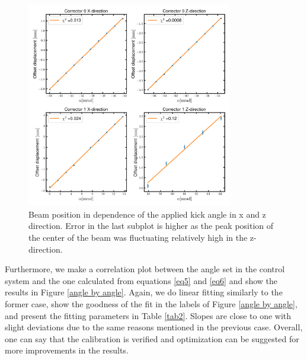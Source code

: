\documentclass[12pt]{article}
\begin{document}
\begin{figure}[H]
    \centering
    \includegraphics[width = 0.8\textwidth]{fig/displacement_by_angle_kickangle.png}
    \caption{Beam position in dependence of the applied kick angle in x and z direction. Error in the last subplot is higher as the peak position of the center of the beam was fluctuating relatively high in the z-direction.}
    \label{kick angle}
\end{figure}

Furthermore, we make a correlation plot between the 
angle set in the control system and the one calculated from equations \ref{eq5} and \ref{eq6} and show the results in Figure \ref{angle by angle}. 
Again, we do linear fitting similarly to the former case, show the goodness of the fit in the labels of Figure \ref{angle by angle}, and present the fitting parameters in Table \ref{tab2}. Slopes are close to one with slight deviations due to the same reasons mentioned in the previous case. Overall, one can say that the calibration is verified and optimization can be suggested for more improvements in the results. 
\end{document}
